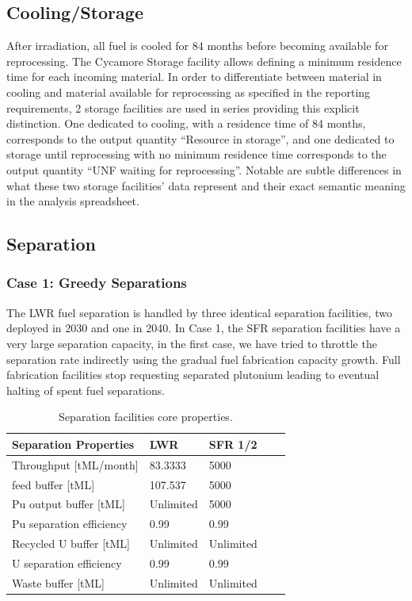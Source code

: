 \documentclass[12pt]{article}
\begin{document}
\subsection{Cooling/Storage}

After irradiation, all fuel is cooled for 84 months before becoming available
for reprocessing.  The Cycamore Storage facility allows defining a minimum
residence time for each incoming material.  In order to 
differentiate between material in cooling and material available for
reprocessing as specified in the reporting requirements, 
2 storage facilities are used in series providing this explicit
distinction. One dedicated to cooling, with a residence time of 84 months,
corresponds to the output quantity ``Resource in storage'', and
one dedicated to storage until reprocessing with no minimum residence time
corresponds to the output quantity ``UNF waiting for reprocessing''.
Notable are subtle differences in
what these two storage facilities' data represent and their exact semantic
meaning in the analysis spreadsheet.

\subsection{Separation}

\subsubsection{Case 1: Greedy Separations}

The LWR fuel separation is handled by three identical separation facilities,
two deployed in 2030 and one in 2040. In Case 1, the SFR separation facilities have a
very large separation capacity, in the first case, we have tried to throttle
the separation rate indirectly using the gradual fuel fabrication capacity
growth. Full fabrication facilities stop requesting separated plutonium
leading to eventual halting of spent fuel separations.


\begin{table}[h!]
    \centering
    \begin{tabular}{lllll}
    \hline
    Separation Properties	&	LWR			&	SFR 1/2	\\
    \hline
    Throughput [tML/month]	&	83.3333		&	5000		\\
    feed buffer [tML]		&	107.537		&	5000		\\
    Pu output buffer [tML]	&	Unlimited	&	5000		\\
    Pu separation efficiency&	0.99		&	0.99		\\
    Recycled U buffer [tML]	&	Unlimited	&	Unlimited	\\
    U separation efficiency	&	0.99		&	0.99		\\
    Waste buffer [tML]		&	Unlimited	&	Unlimited	\\
    \hline
    \end{tabular}
    \caption{Separation facilities core properties. }
    \label{tab:separation_1}
\end{table}
\end{document}
